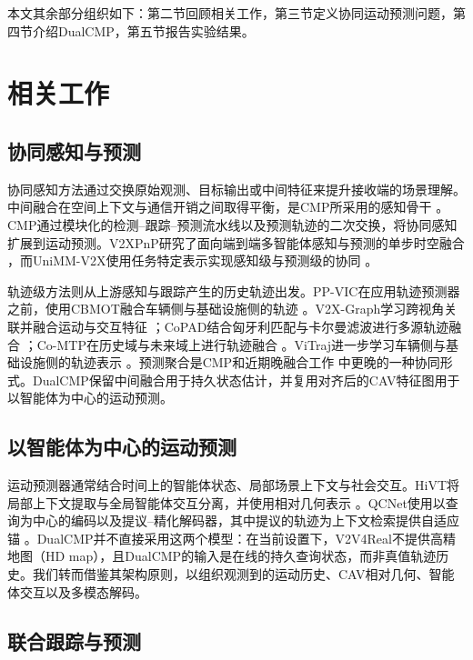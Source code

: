 \documentclass[lettersize,journal]{IEEEtran}
\begin{document}
本文其余部分组织如下：第二节回顾相关工作，第三节定义协同运动预测问题，第四节介绍DualCMP，第五节报告实验结果。

\section{相关工作}
\subsection{协同感知与预测}

协同感知方法通过交换原始观测、目标输出或中间特征来提升接收端的场景理解。中间融合在空间上下文与通信开销之间取得平衡，是CMP所采用的感知骨干 \cite{wang2025cmp}。CMP通过模块化的检测--跟踪--预测流水线以及预测轨迹的二次交换，将协同感知扩展到运动预测。V2XPnP研究了面向端到端多智能体感知与预测的单步时空融合 \cite{zhou2025v2xpnp}，而UniMM-V2X使用任务特定表示实现感知级与预测级的协同 \cite{souig2026unimm}。

轨迹级方法则从上游感知与跟踪产生的历史轨迹出发。PP-VIC在应用轨迹预测器之前，使用CBMOT融合车辆侧与基础设施侧的轨迹 \cite{yu2023v2xseq}。V2X-Graph学习跨视角关联并融合运动与交互特征 \cite{ruan2024v2xgraph}；CoPAD结合匈牙利匹配与卡尔曼滤波进行多源轨迹融合 \cite{wu2025copad}；Co-MTP在历史域与未来域上进行轨迹融合 \cite{zhang2025comtp}。ViTraj进一步学习车辆侧与基础设施侧的轨迹表示 \cite{you2025vitraj}。预测聚合是CMP和近期晚融合工作 \cite{wang2025cmp,madjid2026latefusion} 中更晚的一种协同形式。DualCMP保留中间融合用于持久状态估计，并复用对齐后的CAV特征图用于以智能体为中心的运动预测。

\subsection{以智能体为中心的运动预测}

运动预测器通常结合时间上的智能体状态、局部场景上下文与社会交互。HiVT将局部上下文提取与全局智能体交互分离，并使用相对几何表示 \cite{zhou2022hivt}。QCNet使用以查询为中心的编码以及提议--精化解码器，其中提议的轨迹为上下文检索提供自适应锚 \cite{zhou2023qcnet}。DualCMP并不直接采用这两个模型：在当前设置下，V2V4Real不提供高精地图（HD map），且DualCMP的输入是在线的持久查询状态，而非真值轨迹历史。我们转而借鉴其架构原则，以组织观测到的运动历史、CAV相对几何、智能体交互以及多模态解码。

\subsection{联合跟踪与预测}
\end{document}
